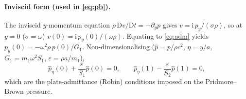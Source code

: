 \documentclass[11pt]{article}
\begin{document}
\paragraph{Inviscid form (used in \eqref{eq:pb}).} The inviscid $y$-momentum equation
$\rho\,\mathrm{D}v/\mathrm{D}t=-\partial_yp$ gives $v=\mathrm{i}\,p_y/(\sigma\rho)$, so at $y=0$
($\sigma=\omega$) $v(0)=\mathrm{i}\,p_y(0)/(\omega\rho)$. Equating to \eqref{eq:adm} yields
$p_y(0)=-\omega^2\rho\,p(0)/G_1$. Non-dimensionalising ($\hat p=p/\rho c^2$, $\eta=y/a$,
$G_1=m_1\omega^2S_1$, $\varepsilon=\rho a/m_1$),
\begin{equation}
\hat p_\eta(0)+\frac{\varepsilon}{S_1}\hat p(0)=0,\qquad
\hat p_\eta(1)-\frac{\varepsilon}{S_2}\hat p(1)=0,
\label{eq:robinp}
\end{equation}
which are the plate-admittance (Robin) conditions imposed on the Pridmore--Brown pressure.
\end{document}
